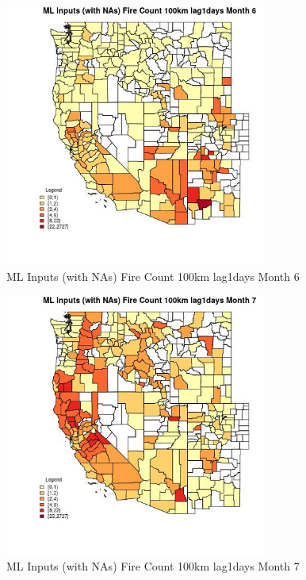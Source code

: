 \begin{figure} 
\centering  
\includegraphics[width=0.77\textwidth]{Code_Outputs/Report_ML_input_PM25_Step4_part_f_de_duplicated_aves_prioritize_24hr_obswNAs_CountyFire_Count_100km_lag1daysmedianMonth6.jpg} 
\caption{\label{fig:Report_ML_input_PM25_Step4_part_f_de_duplicated_aves_prioritize_24hr_obswNAsCountyFire_Count_100km_lag1daysmedianMonth6}ML Inputs (with NAs) Fire Count 100km lag1days Month 6} 
\end{figure} 
 

\begin{figure} 
\centering  
\includegraphics[width=0.77\textwidth]{Code_Outputs/Report_ML_input_PM25_Step4_part_f_de_duplicated_aves_prioritize_24hr_obswNAs_CountyFire_Count_100km_lag1daysmedianMonth7.jpg} 
\caption{\label{fig:Report_ML_input_PM25_Step4_part_f_de_duplicated_aves_prioritize_24hr_obswNAsCountyFire_Count_100km_lag1daysmedianMonth7}ML Inputs (with NAs) Fire Count 100km lag1days Month 7} 
\end{figure} 
 

